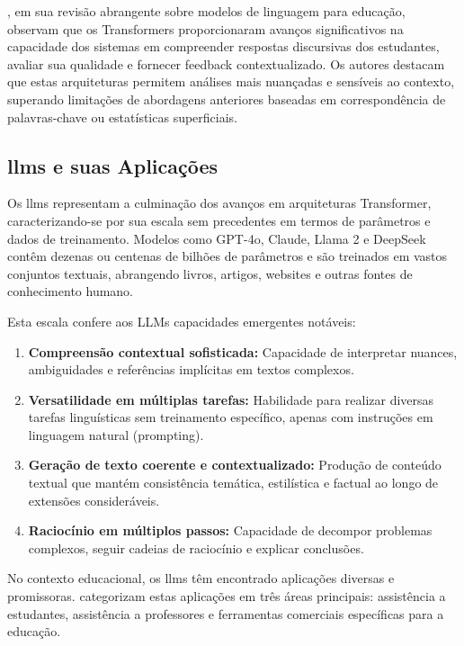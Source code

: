 , em sua revisão abrangente sobre modelos de linguagem para educação, observam que os Transformers proporcionaram avanços significativos na capacidade dos sistemas em compreender respostas discursivas dos estudantes, avaliar sua qualidade e fornecer feedback contextualizado. Os autores destacam que estas arquiteturas permitem análises mais nuançadas e sensíveis ao contexto, superando limitações de abordagens anteriores baseadas em correspondência de palavras-chave ou estatísticas superficiais.

\subsection{\texorpdfstring{\gls{llm}}{LLM}s e suas Aplicações}
\label{subsec:llms}

Os \gls{llm}s representam a culminação dos avanços em arquiteturas Transformer, caracterizando-se por sua escala sem precedentes em termos de parâmetros e dados de treinamento. Modelos como GPT-4o, Claude, Llama 2 e DeepSeek contêm dezenas ou centenas de bilhões de parâmetros e são treinados em vastos conjuntos textuais, abrangendo livros, artigos, websites e outras fontes de conhecimento humano.

Esta escala confere aos LLMs capacidades emergentes notáveis:

\begin{enumerate}
  \item \textbf{Compreensão contextual sofisticada:} Capacidade de interpretar nuances, ambiguidades e referências implícitas em textos complexos.
  
  \item \textbf{Versatilidade em múltiplas tarefas:} Habilidade para realizar diversas tarefas linguísticas sem treinamento específico, apenas com instruções em linguagem natural (prompting).
  
  \item \textbf{Geração de texto coerente e contextualizado:} Produção de conteúdo textual que mantém consistência temática, estilística e factual ao longo de extensões consideráveis.
  
  \item \textbf{Raciocínio em múltiplos passos:} Capacidade de decompor problemas complexos, seguir cadeias de raciocínio e explicar conclusões.
  
\end{enumerate}

No contexto educacional, os \gls{llm}s têm encontrado aplicações diversas e promissoras.  categorizam estas aplicações em três áreas principais: assistência a estudantes, assistência a professores e ferramentas comerciais específicas para a educação.

